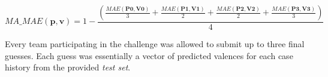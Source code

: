 $$ MA\_MAE(\mathbf{p},\mathbf{v}) = 1 - 
    \frac{(\frac{MAE(\mathbf{P0}, \mathbf{V0})}{3} + 
     \frac{MAE(\mathbf{P1}, \mathbf{V1})}{2} + 
     \frac{MAE(\mathbf{P2}, \mathbf{V2})}{2} + 
     \frac{MAE(\mathbf{P3}, \mathbf{V3})}{3})}{4} $$


Every team participating in the challenge was allowed to submit up to three final guesses. Each guess
was essentially a vector of predicted valences for each case history 
from the provided \textit{test set}.
